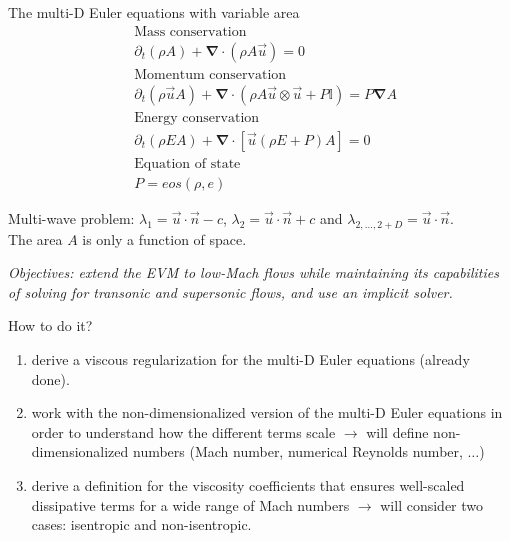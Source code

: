\documentclass[xcolor=dvipsnames,10pt]{beamer}
\renewcommand{\div}{\boldsymbol{\nabla}\! \cdot \!}
\newcommand{\grad}{\boldsymbol{\nabla}}
\begin{document}
\begin{frame}
\begin{block}{The multi-D Euler equations with variable area}
\begin{align}
&\text{Mass conservation} \nonumber \\
&\partial_t ( \rho A ) + \div \left( \rho A \vec{u} \right) = 0 \nonumber \\
&\text{Momentum conservation} \nonumber \\
&\partial_t ( \rho \vec{u} A ) + \div \left( \rho A \vec{u} \otimes \vec{u} + P \mathbb{I} \right) = P \grad A \nonumber \\
&\text{Energy conservation} \nonumber \\
&\partial_t ( \rho E A ) + \div \left[ \vec{u} \left( \rho E + P \right) A \right] = 0 \nonumber \\
&\text{Equation of state} \nonumber \\
& P = eos \left( \rho, e \right) \nonumber 
\end{align}
\end{block}
Multi-wave problem: $\lambda_1 = \vec{u} \cdot \vec{n} - c $, $\lambda_2 = \vec{u} \cdot \vec{n} + c $ and $\lambda_{2, \dots, 2+D} = \vec{u} \cdot \vec{n}$. \\
The area $A$ is only a function of space.
\end{frame}
\begin{frame}
\emph{Objectives: extend the EVM to low-Mach flows while maintaining its capabilities of solving for transonic and supersonic flows, and use an implicit solver.}
\begin{block}{How to do it?}
\begin{enumerate}
\setlength{\itemsep}{10pt}
\item derive a viscous regularization for the multi-D Euler equations (already done).
\item work with the non-dimensionalized version of the multi-D Euler equations in order to understand how the different terms scale $\to$ will define non-dimensionalized numbers (Mach number, numerical Reynolds number, $\dots$)
\item derive a definition for the viscosity coefficients that ensures well-scaled dissipative terms for a wide range of Mach numbers $\to$ will consider two cases: isentropic and non-isentropic.
\end{enumerate}
\end{block}
\end{frame}
\end{document}
